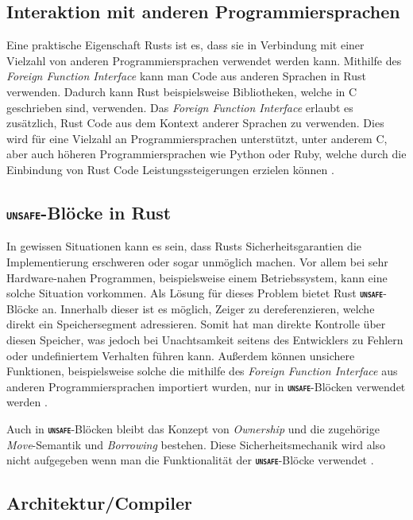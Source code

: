 \subsection{Interaktion mit anderen Programmiersprachen}

Eine praktische Eigenschaft Rusts ist es, dass sie in Verbindung mit einer Vielzahl von anderen Programmiersprachen
verwendet werden kann. Mithilfe des \textit{Foreign Function Interface} kann man Code aus anderen
Sprachen in Rust verwenden. Dadurch kann Rust beispielsweise Bibliotheken, welche in C geschrieben sind, verwenden.
Das \textit{Foreign Function Interface} erlaubt es zusätzlich, Rust Code aus dem Kontext anderer Sprachen zu
verwenden. Dies wird für eine Vielzahl an Programmiersprachen unterstützt, unter anderem C, aber auch höheren
Programmiersprachen wie Python oder Ruby, welche durch die Einbindung von Rust Code Leistungssteigerungen erzielen
können \cite{firstRustBook}\cite{rustBook-1.2.0}.

\subsection{\texttt{\textsc{\textbf{unsafe}}}-Blöcke in Rust}

In gewissen Situationen kann es sein, dass Rusts Sicherheitsgarantien die Implementierung erschweren oder
sogar unmöglich machen. Vor allem bei sehr Hardware-nahen Programmen, beispielsweise einem Betriebssystem,
kann eine solche Situation vorkommen. Als Lösung für dieses Problem bietet Rust
\texttt{\textsc{\textbf{unsafe}}}-Blöcke an. Innerhalb dieser ist es möglich, Zeiger zu dereferenzieren, welche
direkt ein Speichersegment adressieren. Somit hat man direkte Kontrolle über diesen Speicher, was
jedoch bei Unachtsamkeit seitens des Entwicklers zu Fehlern oder undefiniertem Verhalten führen kann.
Außerdem können unsichere Funktionen, beispielsweise solche die mithilfe des
\textit{Foreign Function Interface} aus anderen Programmiersprachen importiert wurden,
nur in \texttt{\textsc{\textbf{unsafe}}}-Blöcken verwendet werden \cite{rustBook}.

Auch in \texttt{\textsc{\textbf{unsafe}}}-Blöcken bleibt das Konzept von \textit{Ownership} und die zugehörige
\textit{Move}-Semantik und \textit{Borrowing} bestehen. Diese Sicherheitsmechanik wird also nicht aufgegeben
wenn man die Funktionalität der \texttt{\textsc{\textbf{unsafe}}}-Blöcke verwendet \cite{rustBook}.

\subsection{Architektur/Compiler}


